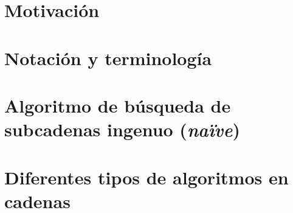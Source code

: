 \lipsum[1-1]

\section{Motivación}
\lipsum[2-4]

\section{Notación y terminología}
\lipsum[2-4]

\section{Algoritmo de búsqueda de subcadenas ingenuo (\textit{naïve})}
\lipsum[2-4]

\section{Diferentes tipos de algoritmos en cadenas}
\lipsum[2-4]
